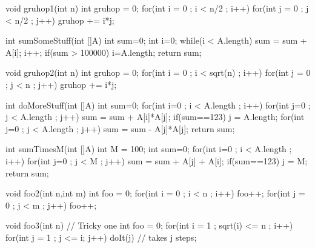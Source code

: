 \begin{pro}
\begin{lenum}
\newpage

\item
\begin{code}
void gruhop1(int n) {
    int gruhop = 0;
    for(int i = 0 ; i < n/2 ; i++) {
        for(int j = 0 ; j < n/2 ; j++) {
            gruhop += i*j;
        }
    }
}
\end{code}


\item
\begin{code}
int sumSomeStuff(int []A) {
    int sum=0;
    int i=0;
    while(i < A.length) {
        sum = sum + A[i];
        i++;
        if(sum > 100000) {
            i=A.length;
        }
    }
    return sum;
}
\end{code}

\item
\begin{code}
void gruhop2(int n) {
    int gruhop = 0;
    for(int i = 0 ; i < sqrt(n) ; i++) {
        for(int j = 0 ; j < n ; j++) {
            gruhop += i*j;
        }
    }
}
\end{code}

\item
\begin{code}
int doMoreStuff(int []A) {
    int sum=0;
    for(int i=0 ; i < A.length ; i++) {
        for(int j=0 ; j < A.length ; j++) {
            sum = sum + A[i]*A[j];
            if(sum==123) {
                j = A.length;
            }
        }
        for(int j=0 ; j < A.length ; j++) {
            sum = sum - A[j]*A[j];
        }
    }
    return sum;
}
\end{code}

\newpage

\item
\begin{code}
int sumTimesM(int []A) {
    int M = 100;
    int sum=0;
    for(int i=0 ; i < A.length ; i++) {
        for(int j=0 ; j < M ; j++) {
            sum = sum + A[j] + A[i];
            if(sum==123) {
                j = M;
            }
        }
    }
    return sum;
}
\end{code}

\item
\begin{code}
void foo2(int n,int m) {
    int foo = 0;
    for(int i = 0 ; i < n ; i++) 
        foo++; 
    for(int j = 0 ; j < m ; j++)
        foo++;
} 
\end{code}

\item
\begin{code}
void foo3(int n) { // Tricky one
    int foo = 0;
    for(int i = 1 ; sqrt(i)  <=  n ; i++)
        for(int j = 1 ; j <= i; j++) 
            doIt(j) // takes j steps;
}
\end{code}


\end{lenum}
\end{pro}
